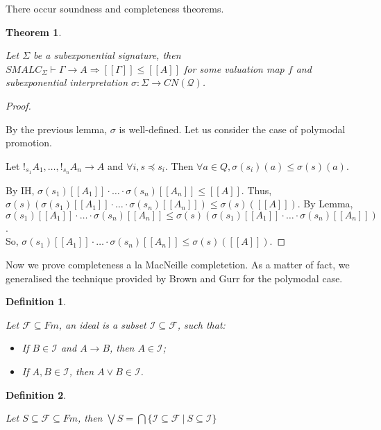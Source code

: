 \documentclass[a4paper]{article}
\theoremstyle{defin}
\newtheorem{defin}{Definition}
\theoremstyle{theorem}
\newtheorem{theorem}{Theorem}
\theoremstyle{prop}
\theoremstyle{lemma}
\theoremstyle{ex}
\theoremstyle{col}
\begin{document}
There occur soundness and completeness theorems.

\begin{theorem}
$ $

  Let $\Sigma$ be a subexponential signature, then
  $SMALC_{\Sigma} \vdash \Gamma \rightarrow A \Rightarrow [\![\Gamma]\!] \leq [\![A]\!]$ for some valuation map $f$ and subexponential interpretation $\sigma : \Sigma \to CN(\mathcal{Q})$.
\end{theorem}

\begin{proof}
  $ $

By the previous lemma, $\sigma$ is well-defined. Let us consider the case of polymodal promotion.

Let $!_{s_1} A_1, \dots, !_{s_n} A_n \rightarrow A$ and $\forall i, s \preceq s_i$. Then $\forall a \in Q, \sigma(s_i)(a) \leq \sigma(s)(a)$.

By IH, $\sigma(s_1)[\![A_1]\!] \cdot \dots \cdot \sigma(s_n) [\![A_n]\!] \leq [\![A]\!]$. Thus,
$\sigma(s)(\sigma(s_1)[\![A_1]\!] \cdot \dots \cdot \sigma(s_n) [\![A_n]\!]) \leq \sigma(s)([\![A]\!])$. By Lemma,
$\sigma(s_1)[\![A_1]\!] \cdot \dots \cdot \sigma(s_n) [\![A_n]\!] \leq \sigma(s)(\sigma(s_1)[\![A_1]\!] \cdot \dots \cdot
\sigma(s_n) [\![A_n]\!])$. \\
So, $\sigma(s_1)[\![A_1]\!] \cdot \dots \cdot \sigma(s_n) [\![A_n]\!] \leq \sigma(s)([\![A]\!])$.
\end{proof}

Now we prove completeness a la MacNeille completetion. As a matter of fact, we generalised the technique provided by Brown and Gurr for the polymodal case.

\begin{defin}
$ $

  Let $\mathcal{F} \subseteq Fm$, an ideal is a subset $\mathcal{I} \subseteq \mathcal{F}$, such that:

\begin{itemize}
  \item If $B \in \mathcal{I}$ and $A \rightarrow B$, then $A \in \mathcal{I}$;
  \item If $A, B \in \mathcal{I}$, then $A \lor B \in \mathcal{I}$.
\end{itemize}
\end{defin}

\begin{defin}
$ $

  Let $S \subseteq \mathcal{F} \subseteq Fm$,
  then $\bigvee S = \bigcap \{ \mathcal{I} \subseteq \mathcal{F} \: | \: S \subseteq \mathcal{I} \}$
\end{defin}
\end{document}
